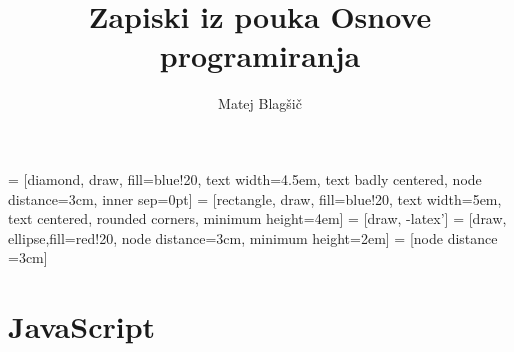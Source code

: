 \documentclass[a4paper, 12pt]{article}
\title{Zapiski iz pouka Osnove programiranja}
\author{Matej Blagšič}
\begin{document}
\lstset{language=html} 

 = [diamond, draw, fill=blue!20, 
text width=4.5em, text badly centered, node distance=3cm, inner sep=0pt]
 = [rectangle, draw, fill=blue!20, 
text width=5em, text centered, rounded corners, minimum height=4em]
 = [draw, -latex']
 = [draw, ellipse,fill=red!20, node distance=3cm,
minimum height=2em]
 = [node distance =3cm]	
\maketitle
\thispagestyle{empty}
\pagebreak
\setcounter{page}{1}

\tableofcontents
\pagebreak

\section*{JavaScript}

\end{document}
